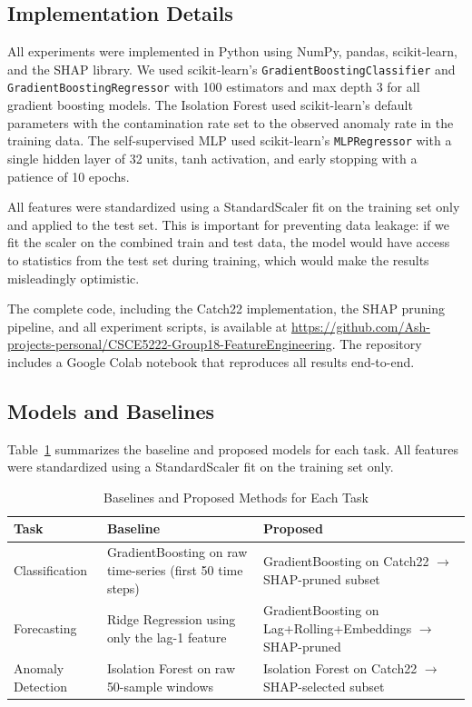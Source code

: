 \documentclass[10pt,conference]{IEEEtran}
\begin{document}
\subsection{Implementation Details}

All experiments were implemented in Python using NumPy, pandas, scikit-learn, and the SHAP library. We used scikit-learn's \texttt{GradientBoostingClassifier} and \texttt{GradientBoostingRegressor} with 100 estimators and max depth 3 for all gradient boosting models. The Isolation Forest used scikit-learn's default parameters with the contamination rate set to the observed anomaly rate in the training data. The self-supervised MLP used scikit-learn's \texttt{MLPRegressor} with a single hidden layer of 32 units, tanh activation, and early stopping with a patience of 10 epochs.

All features were standardized using a StandardScaler fit on the training set only and applied to the test set. This is important for preventing data leakage: if we fit the scaler on the combined train and test data, the model would have access to statistics from the test set during training, which would make the results misleadingly optimistic.

The complete code, including the Catch22 implementation, the SHAP pruning pipeline, and all experiment scripts, is available at \url{https://github.com/Ash-projects-personal/CSCE5222-Group18-FeatureEngineering}. The repository includes a Google Colab notebook that reproduces all results end-to-end.

\subsection{Models and Baselines}

Table~\ref{tab:baselines} summarizes the baseline and proposed models for each task. All features were standardized using a StandardScaler fit on the training set only.

\begin{table}[H]
  \centering
  \caption{Baselines and Proposed Methods for Each Task}
  \label{tab:baselines}
  \renewcommand{\arraystretch}{1.2}
  \begin{tabular}{p{1.3cm}p{2.8cm}p{2.8cm}}
    \toprule
    \textbf{Task} & \textbf{Baseline} & \textbf{Proposed} \\
    \midrule
    Classification & GradientBoosting on raw time-series (first 50 time steps) & GradientBoosting on Catch22 $\rightarrow$ SHAP-pruned subset \\
    \midrule
    Forecasting & Ridge Regression using only the lag-1 feature & GradientBoosting on Lag+Rolling+Embeddings $\rightarrow$ SHAP-pruned \\
    \midrule
    Anomaly Detection & Isolation Forest on raw 50-sample windows & Isolation Forest on Catch22 $\rightarrow$ SHAP-selected subset \\
    \bottomrule
  \end{tabular}
\end{table}
\end{document}
